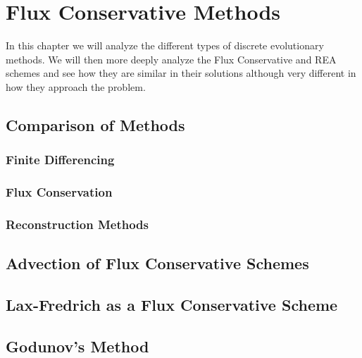 \chapter{Flux Conservative Methods}
In this chapter we will analyze the different types of discrete evolutionary methods. We will then more deeply analyze the Flux Conservative and REA schemes and see how they are similar in  their solutions although very different in how they approach the problem.
\section{Comparison of Methods}
\subsection{Finite Differencing}

\subsection{Flux Conservation}
\subsection{Reconstruction Methods}
\section{Advection of Flux Conservative Schemes}
\section{Lax-Fredrich as a Flux Conservative Scheme}
\section{Godunov's Method}